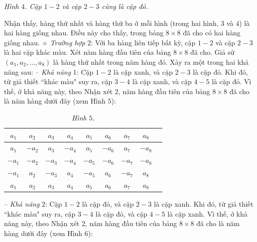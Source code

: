 \begin{multicols}{2}
\begin{table}[H]
		\caption{\small\textit{\color{thachthuctoanhoc}Hình $4$. Cặp $1 - 2$ và cặp $2 - 3$ cùng là cặp đỏ.}}
		\vspace*{-10pt}
	\end{table}
	Nhận thấy, hàng thứ nhất và hàng thứ ba ở mỗi hình (trong hai hình, $3$ và $4$) là hai hàng giống nhau. Điều này cho thấy, trong bảng $8 \times 8$ đã cho có hai hàng giống nhau.
	\vskip 0.05cm
	$\diamond$ \textit{Trường hợp} $2$: Với ba hàng liên tiếp bất kỳ, cặp $1 - 2$ và cặp $2 - 3$ là hai cặp khác màu.
	\vskip 0.05cm
	Xét năm hàng đầu tiên của bảng $8 \times  8$ đã cho.
	\vskip 0.05cm
	Giả sử $\left( {{a_1},{a_2}, \ldots ,{a_8}} \right)$ là hàng thứ nhất trong năm hàng đó.
	\vskip 0.05cm
	Xảy ra một trong hai khả năng sau:
	\vskip 0.05cm
	-- \textit{Khả năng} $1$: Cặp $1 - 2$ là cặp xanh, và cặp $2 - 3$ là cặp đỏ.
	\vskip 0.05cm
	Khi đó, từ giả thiết ``khác màu" suy ra, cặp $3 - 4$ là cặp xanh, và cặp $4 - 5$ là cặp đỏ.
	\vskip 0.05cm
	Vì thế, ở khả năng này, theo Nhận xét $2$, năm hàng đầu tiên của bảng $8 \times  8$ đã cho là năm hàng dưới đây (xem Hình $5$):
	\begin{table}[H]
		\vspace*{-5pt}
		\centering
		\captionsetup{labelformat= empty, justification=centering}
		\renewcommand{\arraystretch}{1.2}
		\setlength{\tabcolsep}{2pt}
		\begin{tabular}{|c|c|c|c|c|c|c|c|c|}
			\hline
			$a_1$ & $a_2$ & $a_3$ & $a_4$ & $a_5$ & $a_6$ & $a_7$ & $a_8$ \\
			\hline
			$a_1$ & $-a_2$ & $a_3$ & $-a_4$ & $a_5$ & $-a_6$ & $a_7$ & $-a_8$ \\
			\hline
			$-a_1$ & $-a_2$ & $-a_3$ & $-a_4$ & $-a_5$ & $-a_6$ & $-a_7$ & $-a_8$ \\
			\hline
			$-a_1$ & $a_2$ & $-a_3$ & $a_4$ & $-a_5$ & $a_6$ & $-a_7$ & $a_8$ \\
			\hline
			$a_1$ & $a_2$ & $a_3$ & $a_4$ & $a_5$ & $a_6$ & $a_7$ & $a_8$ \\
			\hline
		\end{tabular}
		\caption{\small\textit{\color{thachthuctoanhoc}Hình $5$.}}
		\vspace*{-10pt}
	\end{table}
	-- \textit{Khả năng} $2$: Cặp $1 - 2$ là cặp đỏ, và cặp $2 - 3$ là cặp xanh.
	\vskip 0.05cm
	Khi đó, từ giả thiết ``khác màu" suy ra, cặp $3 - 4$ là cặp đỏ, và cặp $4 - 5$ là cặp xanh.
	\vskip 0.05cm
	Vì thế, ở khả năng này, theo Nhận xét $2$, năm hàng đầu tiên của bảng $8 \times  8$ đã cho là năm hàng dưới đây (xem Hình $6$):

\end{multicols}

